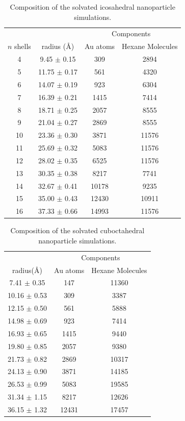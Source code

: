 \begin{table}
\centering
\caption{Composition of the solvated icosahedral nanoparticle simulations.
  \label{tab:icosahedra}}
\begin{tabular}{ cc|cc }
\toprule
       &            & \multicolumn{2}{c}{Components}\\
$n$ shells & radius (\AA) & Au atoms & Hexane Molecules \\
\midrule
4  &  9.45 $\pm$ 0.15  &   309 &  2894      \\
5  & 11.75 $\pm$ 0.17  &   561 &  4320      \\
6  & 14.07 $\pm$ 0.19  &   923 &  6304      \\
7  & 16.39 $\pm$ 0.21  &  1415 &  7414      \\
8  & 18.71 $\pm$ 0.25  &  2057 &  8555      \\
9  & 21.04 $\pm$ 0.27  &  2869 &  8555      \\
10 & 23.36 $\pm$ 0.30  &  3871 & 11576      \\
11 & 25.69 $\pm$ 0.32  &  5083 & 11576      \\
12 & 28.02 $\pm$ 0.35  &  6525 & 11576      \\
13 & 30.35 $\pm$ 0.38  &  8217 &  7741      \\
14 & 32.67 $\pm$ 0.41  & 10178 &  9235      \\
15 & 35.00 $\pm$ 0.43  & 12430 & 10911      \\
16 & 37.33 $\pm$ 0.66  & 14993 & 11576      \\
\bottomrule
\end{tabular}
\end{table}

\begin{table}
\centering
\caption{Composition of the solvated cuboctahedral nanoparticle simulations.
  \label{tab:cubos}}
\begin{tabular}{ c|cc }
\toprule
        & \multicolumn{2}{c}{Components}\\
 radius(\AA)      & Au atoms & Hexane Molecules \\
\midrule
 7.41 $\pm$ 0.35  &   147 & 11360      \\
10.16 $\pm$ 0.53  &   309 &  3387      \\
12.15 $\pm$ 0.50  &   561 &  5888      \\
14.98 $\pm$ 0.69  &   923 &  7414      \\
16.93 $\pm$ 0.65  &  1415 &  9440      \\
19.80 $\pm$ 0.85  &  2057 &  9380      \\
21.73 $\pm$ 0.82  &  2869 & 10317      \\
24.13 $\pm$ 0.90  &  3871 & 14185      \\
26.53 $\pm$ 0.99  &  5083 & 19585      \\
31.34 $\pm$ 1.15  &  8217 & 12626      \\
36.15 $\pm$ 1.32  & 12431 & 17457     \\
\bottomrule
\end{tabular}
\end{table}

